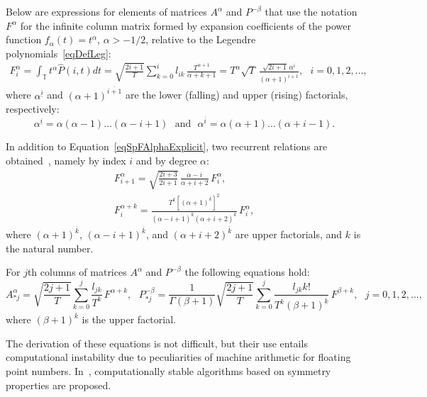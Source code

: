 \documentclass[10pt,reqno]{amsart}
\theoremstyle{plain}
\theoremstyle{remark}
\begin{document}
Below are expressions for elements of matrices $A^\alpha$ and $P^{-\beta}$ that use the notation $F^\alpha$ for the infinite column matrix formed by expansion coefficients of the power function $f_\alpha(t) = t^\alpha$, $\alpha > -1/2$, relative to the Legendre polynomials~\eqref{eqDefLeg}:
\begin{equation}\label{eqSpFAlphaExplicit}
  \begin{gathered}
    F_i^\alpha = \int_\mathds{T} {t^\alpha \hat P(i,t) dt} = \sqrt{\frac{2i+1}{T}} \sum\limits_{k=0}^i {l_{ik} \, \frac{T^{\alpha+1}}{\alpha+k+1}} = T^\alpha \sqrt{T} \, \frac{\sqrt{2i+1} \, \alpha^{\underline{i}}}{(\alpha + 1)^{\overline{i+1}}}, \ \ \ i = 0,1,2,\dots,
  \end{gathered}
\end{equation}
where $\alpha^{\underline{i}}$ and $(\alpha+1)^{\overline{i+1}}$ are the lower (falling) and upper (rising) factorials, respectively:
\[
  \alpha^{\underline{i}} = \alpha (\alpha-1) \ldots (\alpha-i+1) \ \ \ \text{and} \ \ \ \alpha^{\overline{i}} = \alpha (\alpha+1) \ldots (\alpha+i-1).
\]

In addition to Equation~\eqref{eqSpFAlphaExplicit}, two recurrent relations are obtained~\cite{Ryb_Comp25}, namely by index $i$ and by degree $\alpha$:
\begin{gather}
  F_{i+1}^\alpha = \sqrt{\frac{2i+3}{2i+1}} \, \frac{\alpha-i}{\alpha+i+2} \, F_i^\alpha, \label{eqSpFAlphaImplicit} \\
  F_i^{\alpha+k} = \frac{T^k [(\alpha+1)^{\overline{k}}]^2}{(\alpha-i+1)^{\overline{k}}(\alpha+i+2)^{\overline{k}}} \, F_i^\alpha, \label{eqSpFAlphaImplicitAlpha}
\end{gather}
where $(\alpha+1)^{\overline{k}}$, $(\alpha-i+1)^{\overline{k}}$, and $(\alpha+i+2)^{\overline{k}}$ are upper factorials, and $k$ is the natural number.

For $j$th columns of matrices $A^\alpha$ and $P^{-\beta}$ the following equations hold:
\begin{equation}\label{eqSpAIOperExplicit}
  A_{*j}^\alpha = \sqrt{\frac{2j+1}{T}} \sum\limits_{k=0}^j \frac{l_{jk}}{T^k} \, F^{\alpha+k}, \ \ \ P_{*j}^{-\beta} = \frac{1}{\Gamma(\beta+1)} \sqrt{\frac{2j+1}{T}} \sum\limits_{k=0}^j \frac{l_{jk} k!}{T^k (\beta+1)^{\overline{k}}} \, F^{\beta+k}, \ \ \ j = 0,1,2,\dots,
\end{equation}
where $(\beta+1)^{\overline{k}}$ is the upper factorial.

The derivation of these equations is not difficult, but their use entails computational instability due to peculiarities of machine arithmetic for floating point numbers. In~\cite{Ryb_Comp25}, computationally stable algorithms based on symmetry properties are proposed.
\end{document}
